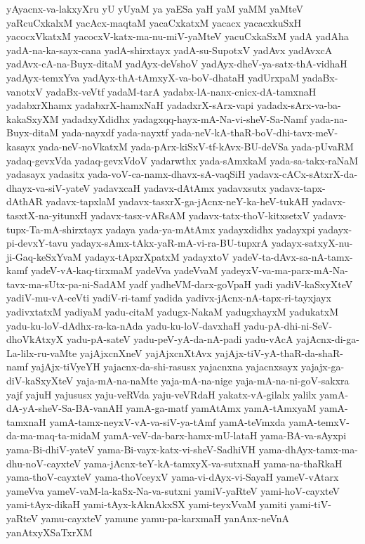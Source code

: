 {yAyacnx-va-lakxyXru
yU
yUyaM
ya
yaESa
yaH
yaM
yaMM
yaMteV
yaRcuCxkalxM
yacAcx-maqtaM
yacaCxkatxM
yacacx
yacacxkuSxH
yacocxVkatxM
yacocxV-katx-ma-nu-miV-yaMteV
yacuCxkaSxM
yadA
yadAha
yadA-na-ka-sayx-cana
yadA-shirxtayx
yadA-su-SupotxV
yadAvx
yadAvxcA
yadAvx-cA-na-Buyx-ditaM
yadAyx-deVshoV
yadAyx-dheV-ya-satx-thA-vidhaH
yadAyx-temxYva
yadAyx-thA-tAmxyX-va-boV-dhataH
yadUrxpaM
yadaBx-vanotxV
yadaBx-veVtf
yadaM-tarA
yadabx-lA-nanx-cnicx-dA-tamxnaH
yadabxrXhamx
yadabxrX-hamxNaH
yadadxrX-sArx-vapi
yadadx-sArx-va-ba-kakaSxyXM
yadadxyXdidhx
yadagxqq-hayx-mA-Na-vi-sheV-Sa-Namf
yada-na-Buyx-ditaM
yada-nayxdf
yada-nayxtf
yada-neV-kA-thaR-boV-dhi-tavx-meV-kasayx
yada-neV-noVkatxM
yada-pArx-kiSxV-tf-kAvx-BU-deVSa
yada-pUvaRM
yadaq-gevxVda
yadaq-gevxVdoV
yadarwthx
yada-sAmxkaM
yada-sa-takx-raNaM
yadasayx
yadasitx
yada-voV-ca-namx-dhavx-sA-vaqSiH
yadavx-cACx-sAtxrX-da-dhayx-va-siV-yateV
yadavxcaH
yadavx-dAtAmx
yadavxsutx
yadavx-tapx-dAthAR
yadavx-tapxlaM
yadavx-tasxrX-ga-jAcnx-neY-ka-heV-tukAH
yadavx-tasxtX-na-yitunxH
yadavx-tasx-vARsAM
yadavx-tatx-thoV-kitxsetxV
yadavx-tupx-Ta-mA-shirxtayx
yadaya
yada-ya-mAtAmx
yadayxdidhx
yadayxpi
yadayx-pi-devxY-tavu
yadayx-sAmx-tAkx-yaR-mA-vi-ra-BU-tupxrA
yadayx-satxyX-nu-ji-Gaq-keSxYvaM
yadayx-tApxrXpatxM
yadayxtoV
yadeV-ta-dAvx-sa-nA-tamx-kamf
yadeV-vA-kaq-tirxmaM
yadeVva
yadeVvaM
yadeyxV-va-ma-parx-mA-Na-tavx-ma-sUtx-pa-ni-SadAM
yadf
yadheVM-darx-goVpaH
yadi
yadiV-kaSxyXteV
yadiV-mu-vA-ceVti
yadiV-ri-tamf
yadida
yadivx-jAcnx-nA-tapx-ri-tayxjayx
yadivxtatxM
yadiyaM
yadu-citaM
yadugx-NakaM
yadugxhayxM
yadukatxM
yadu-ku-loV-dAdhx-ra-ka-nAda
yadu-ku-loV-davxhaH
yadu-pA-dhi-ni-SeV-dhoVkAtxyX
yadu-pA-sateV
yadu-peV-yA-da-nA-padi
yadu-vAcA
yajAcnx-di-ga-La-lilx-ru-vaMte
yajAjxcnXneV
yajAjxcnXtAvx
yajAjx-tiV-yA-thaR-da-shaR-namf
yajAjx-tiVyeYH
yajacnx-da-shi-rasusx
yajacnxna
yajacnxsayx
yajajx-ga-diV-kaSxyXteV
yaja-mA-na-naMte
yaja-mA-na-nige
yaja-mA-na-ni-goV-sakxra
yajf
yajuH
yajususx
yaju-veRVda
yaju-veVRdaH
yakatx-vA-gilalx
yalilx
yamA-dA-yA-sheV-Sa-BA-vanAH
yamA-ga-matf
yamAtAmx
yamA-tAmxyaM
yamA-tamxnaH
yamA-tamx-neyxV-vA-va-siV-ya-tAmf
yamA-teVmxda
yamA-temxV-da-ma-maq-ta-midaM
yamA-veV-da-barx-hamx-mU-lataH
yama-BA-va-sAyxpi
yama-Bi-dhiV-yateV
yama-Bi-vayx-katx-vi-sheV-SadhiVH
yama-dhAyx-tamx-ma-dhu-noV-cayxteV
yama-jAcnx-teY-kA-tamxyX-va-sutxnaH
yama-na-thaRkaH
yama-thoV-cayxteV
yama-thoVceyxV
yama-vi-dAyx-vi-SayaH
yameV-vAtarx
yameVva
yameV-vaM-la-kaSx-Na-va-sutxni
yamiV-yaRteV
yami-hoV-cayxteV
yami-tAyx-dikaH
yami-tAyx-kAknAkxSX
yami-teyxVvaM
yamiti
yami-tiV-yaRteV
yamu-cayxteV
yamune
yamu-pa-karxmaH
yanAnx-neVnA
yanAtxyXSaTxrXM
}
